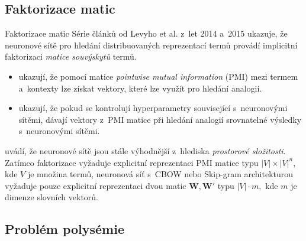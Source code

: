 
\subsection{Faktorizace matic}

\begin{frame}{Faktorizace matic}
Série článků od Levyho et al. z~let 2014 a~2015 ukazuje, že neuronové sítě pro
hledání distribuovaných reprezentací termů provádí implicitní faktorizaci
\emph{matice souvýskytů} termů.

\pause

\begin{itemize}[<+->]
\item \cite{levy14b} ukazují, že pomocí matice \emph{pointwise mutual
  information} (PMI) mezi termem a~kontexty
  lze získat vektory, které lze využít pro hledání analogií.
\item \cite{levy15} ukazují, že pokud se kontrolují hyperparametry
	související s~neuronovými sítěmi, dávají vektory z~PMI matice při hledání
	analogií srovnatelné výsledky s~neuronovými sítěmi.
\end{itemize}

\pause

\textcite[36 minut a~40 sekund]{rong15b} uvádí, že neuronové sítě jsou stále
výhodnější z~hlediska \emph{prostorové složitosti}.
Zatímco faktorizace vyžaduje explicitní reprezentaci PMI matice typu
$|V|\times|V|^n$, kde $V$ je množina termů, neuronová síť s~CBOW nebo Skip-gram
architekturou vyžaduje pouze explicitní reprezentaci dvou matic $\mathbf W,
\mathbf W'$ typu $|V|\cdot m,$ kde $m$ je dimenze slovních vektorů.

\end{frame}

\subsection{Problém polysémie}

